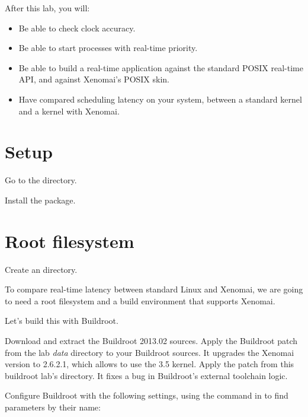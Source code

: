 
After this lab, you will:
\begin{itemize}
\item Be able to check clock accuracy.
\item Be able to start processes with real-time priority.
\item Be able to build a real-time application against the standard
POSIX real-time API, and against Xenomai's POSIX skin.
\item Have compared scheduling latency on your system, between a standard kernel and a kernel with Xenomai.
\end{itemize}

\section{Setup}

Go to the  directory.

Install the  package.

\section{Root filesystem}

Create an  directory.

To compare real-time latency between standard Linux and Xenomai, we
are going to need a root filesystem and a build environment that
supports Xenomai.

Let's build this with Buildroot.

Download and extract the Buildroot 2013.02 sources. Apply the
Buildroot patch 
from the lab {\em data} directory to your Buildroot sources. It
upgrades the Xenomai version to 2.6.2.1, which allows to use the 3.5
kernel. Apply the
patch from this buildroot lab's  directory. It fixes a bug
in Buildroot's external toolchain logic.

Configure Buildroot with the following settings, using the \code{/}
command in  to find parameters by their name:

